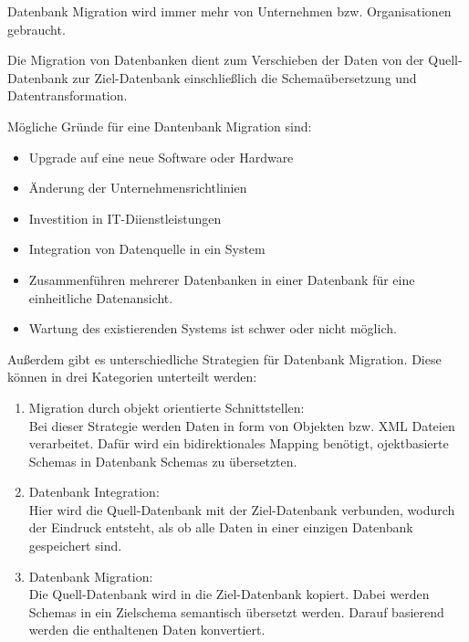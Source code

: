 


Datenbank Migration wird immer mehr von Unternehmen bzw. Organisationen gebraucht. 

Die Migration von Datenbanken dient zum Verschieben der Daten von der Quell-Datenbank zur Ziel-Datenbank einschließlich die Schemaübersetzung und Datentransformation.


Mögliche Gründe für eine Dantenbank Migration sind:
\begin{itemize}
	\item Upgrade auf eine neue Software oder Hardware
	\item Änderung der Unternehmensrichtlinien
	\item Investition in IT-Diienstleistungen
	\item Integration von Datenquelle in ein System
	\item Zusammenführen mehrerer Datenbanken in einer Datenbank für eine einheitliche Datenansicht.
	\item Wartung des existierenden Systems ist schwer oder nicht möglich.
\end{itemize}

Außerdem gibt es unterschiedliche Strategien für Datenbank Migration. Diese können in drei Kategorien unterteilt werden:

\begin{enumerate}
	\item Migration durch objekt orientierte Schnittstellen: \\
	Bei dieser Strategie werden Daten in form von Objekten bzw. XML Dateien verarbeitet. Dafür wird ein bidirektionales Mapping benötigt, ojektbasierte Schemas in Datenbank Schemas zu übersetzten.
	\item Datenbank Integration: \\
	Hier wird die Quell-Datenbank mit der Ziel-Datenbank verbunden, wodurch der Eindruck entsteht, als ob alle Daten in einer einzigen Datenbank gespeichert sind.	
	\item Datenbank Migration: \\
	Die Quell-Datenbank wird in die Ziel-Datenbank kopiert. Dabei werden Schemas in ein Zielschema semantisch übersetzt werden. Darauf basierend werden die enthaltenen Daten konvertiert.
\end{enumerate}



